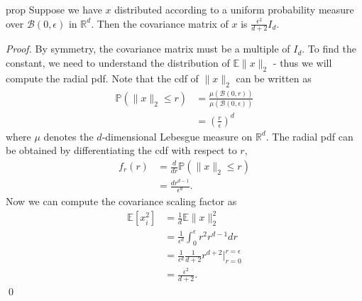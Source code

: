 \documentclass[11pt]{article}
\begin{document}
\begin{restatable}{prop}{} \label{prop: spherical cov}
    Suppose we have $x$ distributed according to a uniform probability measure over $\mathcal{B}(0,\epsilon)$ in $\mathbb{R}^d$. Then the covariance matrix of $x$ is $\frac{\epsilon^2}{d+2}I_d$. 
\end{restatable}
\noindent \textit{Proof.} By symmetry, the covariance matrix must be a multiple of $I_d$. To find the constant, we need to understand the distribution of $\mathbb{E}\|x\|_2$ - thus we will compute the radial pdf. Note that the cdf of $\|x\|_2$ can be written as
\begin{align*}
    \mathbb{P}(\|x\|_2 \leq r) &= \frac{\mu(\mathcal{B}(0,r))}{\mu(\mathcal{B}(0,\epsilon))} \\
    &= \left(\frac{r}{\epsilon }\right)^d
\end{align*}
where $\mu$ denotes the $d$-dimensional Lebesgue measure on $\mathbb{R}^d$. The radial pdf can be obtained by differentiating the cdf with respect to $r$,
\begin{align*}
    f_r(r) &= \frac{d}{dr}\mathbb{P}(\|x\|_2\leq r) \\
    &= \frac{dr^{d-1}}{\epsilon^d}.
\end{align*}
Now we can compute the covariance scaling factor as 
\begin{align*}
    \mathbb{E}[x_i^2] &= \frac{1}{d}\mathbb{E}\|x\|_2^2 \\
    &=\frac{1}{\epsilon^d}\int_{0}^{\epsilon}r^2r^{d-1}dr \\
    &= \frac{1}{\epsilon^d}\frac{1}{d+2}r^{d+2} \Bigg|^{r=\epsilon}_{r=0} \\
    &= \frac{\epsilon^2}{d+2}.
\end{align*}
\qed{}



\end{document}
